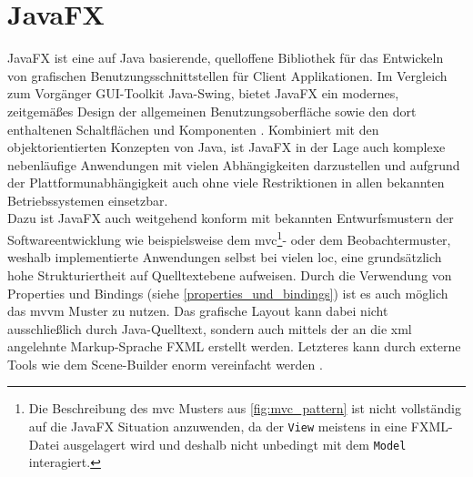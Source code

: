 \section{JavaFX}
\label{javafx}
\noindent JavaFX ist eine auf Java basierende, quelloffene Bibliothek für das Entwickeln von grafischen Benutzungsschnittstellen für Client Applikationen. Im Vergleich zum Vorgänger GUI-Toolkit Java-Swing, bietet JavaFX ein modernes, zeitgemäßes Design der allgemeinen Benutzungsoberfläche sowie den dort enthaltenen Schaltflächen und Komponenten \cite{Sharan2015}. Kombiniert mit den objektorientierten Konzepten von Java, ist JavaFX in der Lage auch komplexe nebenläufige Anwendungen mit vielen Abhängigkeiten darzustellen und aufgrund der Plattformunabhängigkeit auch ohne viele Restriktionen in allen bekannten Betriebssystemen einsetzbar.\\
Dazu ist JavaFX auch weitgehend konform mit bekannten Entwurfsmustern der Softwareentwicklung wie beispielsweise dem \ac{mvc}\footnote{Die Beschreibung des \ac{mvc} Musters aus \autoref{fig:mvc_pattern} ist nicht vollständig auf die JavaFX Situation anzuwenden, da der  \texttt{View} meistens in eine FXML-Datei ausgelagert wird und deshalb nicht unbedingt mit dem \texttt{Model} interagiert.}- oder dem Beobachtermuster, weshalb implementierte Anwendungen selbst bei vielen \ac{loc}, eine grundsätzlich hohe Strukturiertheit auf Quelltextebene aufweisen. Durch die Verwendung von Properties und Bindings (siehe \autoref{properties_und_bindings}) ist es auch möglich das \ac{mvvm} Muster zu nutzen. Das grafische Layout kann dabei nicht ausschließlich durch Java-Quelltext, sondern auch mittels der an die \ac{xml} angelehnte Markup-Sprache FXML erstellt werden. Letzteres kann durch externe Tools wie dem Scene-Builder enorm vereinfacht werden \cite{Vos2018}.

